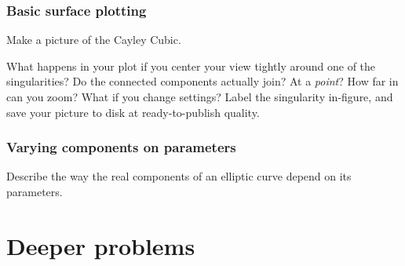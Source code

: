 \documentclass[letter,portrait]{article}
\newcommand{\1}{{\tt \_1}}
\newcommand{\2}{{\tt \_2}}
\begin{document}
\subsubsection{Basic surface plotting}
\label{sec:basic_surface_plot}

Make a picture of the Cayley Cubic.

What happens in your plot if you center your view tightly around one of the singularities?  Do the connected components actually join?  At a {\em point}?  How far in can you zoom?  What if you change settings?  Label the singularity in-figure, and save your picture to disk at ready-to-publish quality.



\subsubsection{Varying components on parameters}

Describe the way the real components of an elliptic curve depend on its parameters.






\clearpage
\section{Deeper problems}


\end{document}

